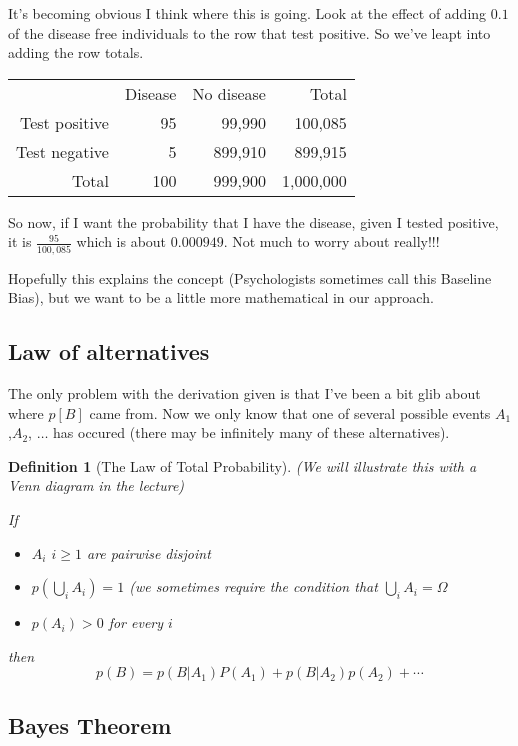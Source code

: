 \documentclass[12pt]{extbook}
\newtheorem{df}{Definition}[section]
\begin{document}
It's becoming obvious I think where this is going.   Look at the effect of adding $0.1$ of the disease free individuals to the row that test positive.  So we've leapt into adding the row totals.

\begin{tabular}{rrrr}
 & Disease & No disease & Total \\
Test positive & 95 & 99,990 & 100,085 \\
Test negative & 5 & 899,910 & 899,915 \\
Total & 100 & 999,900 & 1,000,000
\end{tabular}


So now, if I want the probability that I have the disease, given I tested positive, it is $\frac{95}{100,085}$ which is about $0.000949$.    Not much to worry about really!!!

Hopefully this explains the concept (Psychologists sometimes call this Baseline Bias), but we want to be a little more mathematical in our approach.



\subsection{Law of alternatives}

The only problem with the derivation given is that I've been a bit glib about where $p[B]$ came from.   Now we only know that one of several possible events $A_1$,$A_2$, $\ldots$ has occured (there may be infinitely many of these alternatives).

\begin{df}[The Law of Total Probability]

(We will illustrate this with a Venn diagram in the lecture)

If
\begin{itemize}
\item $A_i$ $i \geq 1$ are pairwise disjoint
\item $p(\bigcup_i A_i)=1$ (we sometimes require the condition that $\bigcup_i A_i = \Omega$
\item $p(A_i)>0$ for every $i$
\end{itemize}
then
\begin{displaymath}
p(B)=p(B|A_1)P(A_1) + p(B|A_2)p(A_2) + \cdots
\end{displaymath}

\end{df}

 
\subsection{Bayes Theorem}
\end{document}
